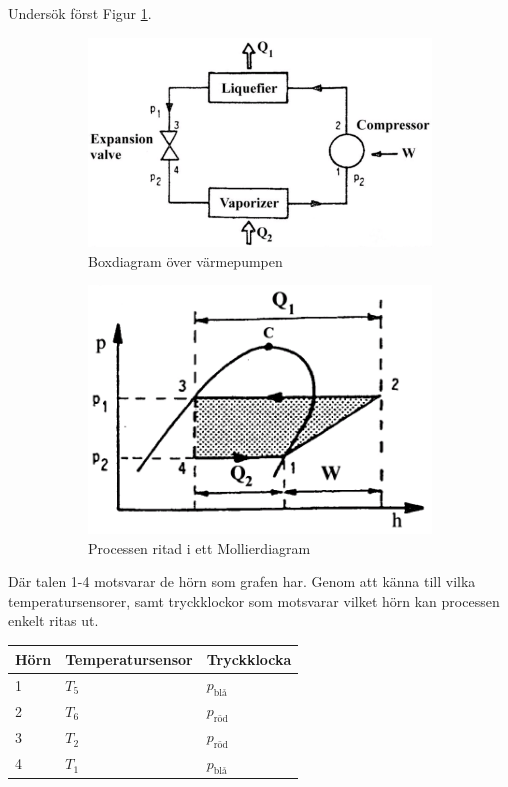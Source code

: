 \documentclass[11pt]{article}
\begin{document}
Undersök först Figur \ref{Fig: mollier}.

\begin{figure}[h]
\centering
\begin{subfigure}{.5\textwidth}
  \centering
  \includegraphics[width=.9\linewidth]{BoxDiagram.png}
  \caption{Boxdiagram över värmepumpen}
\end{subfigure}%
\begin{subfigure}{.5\textwidth}
  \centering
  \includegraphics[width=.9\linewidth]{ProcessDiagram.png}
  \caption{Processen ritad i ett Mollierdiagram}
\end{subfigure}
\caption{}
\label{Fig: mollier}
\end{figure}

Där talen 1-4 motsvarar de hörn som grafen har. Genom att känna till vilka temperatursensorer, samt tryckklockor som motsvarar vilket hörn kan processen enkelt ritas ut.

\begin{table}[h]
\centering
\label{my-label}
\begin{tabular}{l|l|l}
Hörn & Temperatursensor & Tryckklocka      \\ \hline
1    & $T_5$            & $p_{\text{blå}}$ \\ \hline
2    & $T_6$            & $p_{\text{röd}}$ \\ \hline
3    & $T_2$            & $p_{\text{röd}}$ \\ \hline
4    & $T_1$            & $p_{\text{blå}}$ \\ \hline
\end{tabular}
\end{table}
\end{document}
